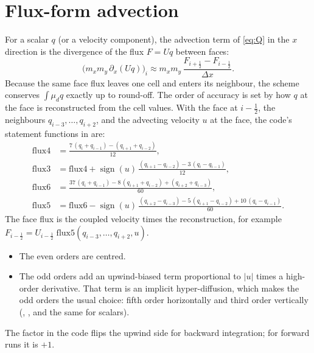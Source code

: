 \section{Flux-form advection}

For a scalar $q$ (or a velocity component), the advection term of \cref{eq:Q} in the $x$ direction is the
divergence of the flux $F = U q$ between faces:
\begin{equation}
  \bigl(m_x m_y\,\partial_x(Uq)\bigr)_{i} \approx m_x m_y\,\frac{F_{i+\frac12} - F_{i-\frac12}}{\Delta x} .
\end{equation}
Because the same face flux leaves one cell and enters its neighbour, the scheme conserves $\int \mu_d q$ exactly up
to round-off. The order of accuracy is set by how $q$ at the face is reconstructed from the cell values. With the
face at $i - \frac12$, the neighbours $q_{i-3}, \dots, q_{i+2}$, and the advecting velocity $u$ at the face, the
code's statement functions in  are:
\begin{align}
  \mathrm{flux4} &= \frac{7\,(q_i + q_{i-1}) - (q_{i+1} + q_{i-2})}{12}, \label{eq:flux4}\\
  \mathrm{flux3} &= \mathrm{flux4} + \operatorname{sign}(u)\,
                    \frac{(q_{i+1} - q_{i-2}) - 3\,(q_i - q_{i-1})}{12}, \label{eq:flux3}\\
  \mathrm{flux6} &= \frac{37\,(q_i + q_{i-1}) - 8\,(q_{i+1} + q_{i-2}) + (q_{i+2} + q_{i-3})}{60}, \label{eq:flux6}\\
  \mathrm{flux5} &= \mathrm{flux6} - \operatorname{sign}(u)\,
                    \frac{(q_{i+2} - q_{i-3}) - 5\,(q_{i+1} - q_{i-2}) + 10\,(q_i - q_{i-1})}{60}. \label{eq:flux5}
\end{align}
The face flux is the coupled velocity times the reconstruction, for example
$F_{i-\frac12} = U_{i-\frac12}\;\mathrm{flux5}(q_{i-3}, \dots, q_{i+2}, u)$.
\begin{itemize}
  \item The even orders are centred.
  \item The odd orders add an upwind-biased term proportional to $|u|$ times a high-order derivative. That term is
    an implicit hyper-diffusion, which makes the odd orders the usual choice: fifth order horizontally and third
    order vertically (, , and the same for scalars).
\end{itemize}
The factor  in the code flips the upwind side for backward integration; for forward runs it
is $+1$.

